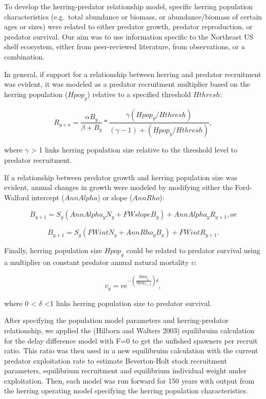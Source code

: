 \documentclass[]{article}
\begin{document}
To develop the herring-predator relationship model, specific herring
population characteristics (e.g.~total abundance or biomass, or
abundance/biomass of certain ages or sizes) were related to either
predator growth, predator reproduction, or predator survival. Our aim
was to use information specific to the Northeast US shelf ecosystem,
either from peer-reviewed literature, from observations, or a
combination.

In general, if support for a relationship between herring and predator
recruitment was evident, it was modeled as a predator recruitment
multiplier based on the herring population (\(Hpop_{y}\)) relative to a
specified threshold \(Hthresh\):

\begin{equation}
R_{y+a} = \frac{\alpha B_{y}}{\beta + B_{y}} * \frac{\gamma(Hpop_{y}/Hthresh)}{(\gamma-1)+(Hpop_{y}/Hthresh)} \label{recwithherring_equation}, 
\end{equation}

where \(\gamma\) \textgreater{} 1 links herring population size relative
to the threshold level to predator recruitment.

If a relationship between predator growth and herring population size
was evident, annual changes in growth were modeled by modifying either
the Ford-Walford intercept (\(AnnAlpha\)) or slope (\(AnnRho\)):

\begin{equation}
B_{y+1} = S_{y} (AnnAlpha_{y} N_{y} + FWslope B_{y}) + AnnAlpha_{y}R_{y+1} \label{delaydiffB_equation}, or
\end{equation}

\begin{equation}
B_{y+1} = S_{y} (FWint N_{y} + AnnRho_{y} B_{y}) + FWint R_{y+1} \label{delaydiffB_equation}.
\end{equation}

Finally, herring population size \(Hpop_{y}\) could be related to
predator survival using a multiplier on constant predator annual natural
mortality \(v\):

\begin{equation}
v_{y} =  v e ^ {-(\frac{Hpop_{y}}{Hpop_{F=0}})\delta} \label{varmort_equation},
\end{equation}

where 0 \textless{} \(\delta\) \textless{}1 links herring population
size to predator survival.

After specifying the population model parameters and herring-predator
relationship, we applied the (Hilborn and Walters 2003) equilibruim
calculation for the delay difference model with F=0 to get the unfished
spawners per recruit ratio. This ratio was then used in a new
equilibruim calculation with the current predator exploitation rate to
estimate Beverton-Holt stock recruitment parameters, equilibrium
recruitment and equilibrium individual weight under exploitation. Then,
each model was run forward for 150 years with output from the herring
operating model specifying the herring population characteristics.
\end{document}
